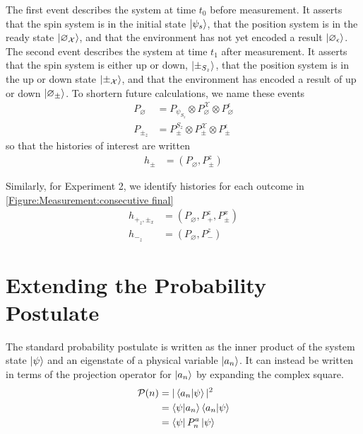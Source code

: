 The first event describes the system at time $t_0$ before measurement. It asserts that the spin system is in the initial state $\ket{\psi_s}$, that the position system is in the ready state ${\ket{\varnothing_\mathcal{X}}}$, and that the environment has not yet encoded a result $\ket{\varnothing_\epsilon}$. The second event describes the system at time $t_1$ after measurement. It asserts that the spin system is either up or down, $\ket{\pm_{S_z}}$, that the position system is in the up or down state ${\ket{\pm_\mathcal{X}}}$, and that the environment has encoded a result of up or down $\ket{\varnothing_\pm}$.  To shortern future calculations, we name these events
\begin{align}
  P_\varnothing &= P_{\psi_{S_z}} \otimes P^\mathcal{X}_\varnothing \otimes P^\epsilon_\varnothing  \\ \nonumber
  P_{\pm_z} &= P^{S_z}_\pm \otimes P^\mathcal{X}_\pm \otimes P^\epsilon_\pm
\end{align}
so that the histories of interest are written
\begin{align}
  h_\pm &= \left(P_\varnothing, P^z_{\pm} \right)
\end{align}

Similarly, for Experiment 2, we identify histories for each outcome in \autoref{Figure:Measurement:consecutive final}
\begin{align} \label{eq:Experiment 2 Histories}
  h_{+_z, \pm_x} &= \left(P_\varnothing, P^z_+, P^x_\pm \right) \\ \nonumber
  h_{-_z} &= \left(P_\varnothing, P^z_-\right)
\end{align}

\section{Extending the Probability Postulate}

The standard probability postulate is written as the inner product of the system state $\ket{\psi}$ and an eigenstate of a physical variable $\ket{a_n}$. It can instead be written in terms of the projection operator for $\ket{a_n}$ by expanding the complex square.
\begin{align}
        \mathcal{P}(n) &= |\braket{a_n|\psi}|^2 \\ \nonumber
        &= \braket{\psi|a_n} \braket{a_n|\psi} \\ \nonumber
        &= \bra{\psi} P^a_n \ket{\psi}
\end{align}

